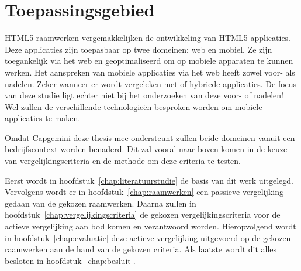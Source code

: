 \section{Toepassingsgebied} %
HTML5-raamwerken vergemakkelijken de ontwikkeling van HTML5-applicaties.
Deze applicaties zijn toepasbaar op twee domeinen: web en mobiel.
Ze zijn toegankelijk via het web en geoptimaliseerd om op mobiele apparaten te kunnen werken.
Het aanspreken van mobiele applicaties via het web heeft zowel voor- als nadelen.
Zeker wanneer er wordt vergeleken met  of hybriede applicaties.
De focus van deze studie ligt echter niet bij het onderzoeken van deze voor- of nadelen!
Wel zullen de verschillende technologieën besproken worden om mobiele applicaties te maken.

Omdat Capgemini deze thesis mee ondersteunt zullen beide domeinen vanuit een bedrijfscontext worden benaderd.
Dit zal vooral naar boven komen in de keuze van vergelijkingscriteria en de methode om deze criteria te testen.


Eerst wordt in hoofdstuk~\ref{chap:literatuurstudie} de basis van dit werk uitgelegd.
Vervolgens wordt er in hoofdstuk~\ref{chap:raamwerken} een passieve vergelijking gedaan van de gekozen raamwerken.
Daarna zullen in hoofdstuk~\ref{chap:vergelijkingscriteria} de gekozen vergelijkingscriteria voor de actieve vergelijking aan bod komen en verantwoord worden.
Hieropvolgend wordt in hoofdstuk~\ref{chap:evaluatie} deze actieve vergelijking uitgevoerd op de gekozen raamwerken aan de hand van de gekozen criteria.
Als laatste wordt dit alles besloten in hoofdstuk~\ref{chap:besluit}.

